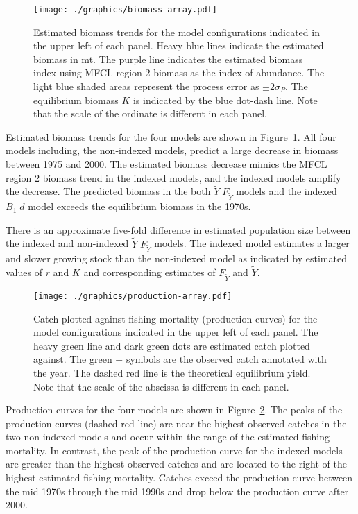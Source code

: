 \documentclass[12pt,letterpaper,twoside]{article}
\newcommand\MSY{\widetilde{Y}}
\newcommand\Fmsy{F_{\MSY}}
\newcommand\MSYFmsy{\MSY\;\Fmsy}
\newcommand\Bd{B_1\; d}
\begin{document}
\begin{figure}
\begin{center}
\texttt{[image: ./graphics/biomass-array.pdf]}
\caption{\label{fig:estbiomass}
Estimated biomass trends for the model configurations indicated in
the upper left of each panel.
Heavy blue lines indicate the estimated biomass in mt.
The purple line indicates the estimated biomass index using MFCL
region 2 biomass as the index of abundance.
The light blue shaded areas represent the process error as 
$\pm 2\sigma_P$.
The equilibrium biomass $K$ is indicated by the blue dot-dash line.
Note that the scale of the ordinate is different in each panel.
}
\end{center}
\end{figure}

Estimated biomass trends for the four models are shown in
Figure~\ref{fig:estbiomass}.
All four models including, the non-indexed models, predict a large
decrease in biomass between 1975 and 2000. The estimated biomass
decrease mimics the MFCL region 2 biomass trend in the
indexed models, and the indexed models amplify the decrease. The
predicted biomass in the both $\MSYFmsy$ models
and the indexed $\Bd$ model exceeds the equilibrium biomass in the 1970s.
\pagebreak

There is an approximate five-fold difference in estimated population size
between the indexed and non-indexed $\MSYFmsy$ models.
The indexed model estimates a larger and slower growing stock than the
non-indexed model as indicated by 
estimated values of $r$ and $K$ and corresponding estimates of $\Fmsy$
and $\MSY$.

\begin{figure}
\begin{center}
\texttt{[image: ./graphics/production-array.pdf]}
\caption{\label{fig:estprod}
Catch plotted against fishing mortality (production curves)
for the model configurations indicated in the upper left of each panel.
The heavy green line and dark green dots are estimated catch plotted
against.
The green $+$ symbols are the observed catch annotated with the year.
The dashed red line is the theoretical equilibrium yield.
Note that the scale of the abscissa is different in each panel.
}
\end{center}
\end{figure}

Production curves for the four models are shown in
Figure~\ref{fig:estprod}.
The peaks of the production curves
(dashed red line) are near the highest observed catches
in the two non-indexed models and occur within the range of the
estimated fishing mortality.
In contrast, the peak of the production curve for the indexed models
are greater than the highest observed catches and are located
to the right of the highest estimated fishing mortality.
Catches exceed the production curve between the mid 1970s through the
mid 1990s and drop below the production curve after 2000.
\end{document}
